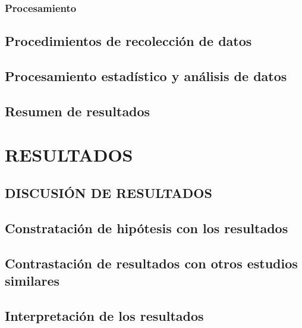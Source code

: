 \documentclass[12pt,a4paper,oneside]{book}
\begin{document}
\subsection{Procesamiento}

\section{Procedimientos de recolección de datos}

\section{Procesamiento estadístico y análisis de datos}

\section{Resumen de resultados}


\chapter{RESULTADOS}


\section{DISCUSIÓN DE RESULTADOS}


\section{Constratación de hipótesis con los resultados}

\section{Contrastación de resultados con otros estudios similares}

\section{Interpretación de los resultados}
\end{document}
